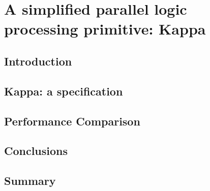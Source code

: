 \chapter{A simplified parallel logic processing primitive: Kappa}
\label{kappa}

\section{Introduction}

\section{Kappa: a specification}

\section{Performance Comparison}

\section{Conclusions}

\section{Summary}

